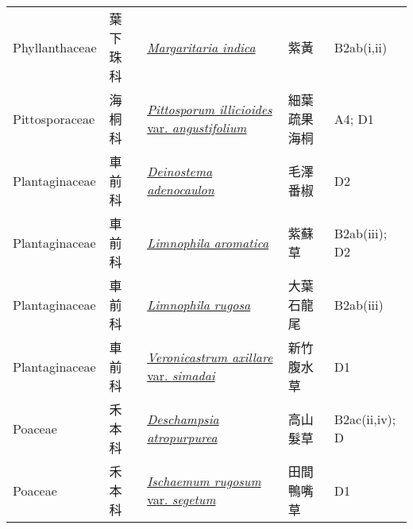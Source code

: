 {\begin{longtable}{L{2.5cm}L{2cm}L{5cm}L{2.5cm}L{3cm}}
    Phyllanthaceae & 葉下珠科 & \href{http://www.theplantlist.org/tpl1.1/search?q=Margaritaria+indica}{\textit{Margaritaria indica} } & 紫黃 & B2ab(i,ii)    \\
    Pittosporaceae & 海桐科 & \href{http://www.theplantlist.org/tpl1.1/search?q=Pittosporum+illicioides+var.+angustifolium}{\textit{Pittosporum illicioides} var. \textit{angustifolium} } & 細葉疏果海桐 & A4; D1    \\
    Plantaginaceae & 車前科 & \href{http://www.theplantlist.org/tpl1.1/search?q=Deinostema+adenocaulon}{\textit{Deinostema adenocaulon} } & 毛澤番椒 & D2    \\
    Plantaginaceae & 車前科 & \href{http://www.theplantlist.org/tpl1.1/search?q=Limnophila+aromatica}{\textit{Limnophila aromatica} } & 紫蘇草 & B2ab(iii); D2    \\
    Plantaginaceae & 車前科 & \href{http://www.theplantlist.org/tpl1.1/search?q=Limnophila+rugosa}{\textit{Limnophila rugosa} } & 大葉石龍尾 & B2ab(iii)    \\
    Plantaginaceae & 車前科 & \href{http://www.theplantlist.org/tpl1.1/search?q=Veronicastrum+axillare+var.+simadai}{\textit{Veronicastrum axillare} var. \textit{simadai} } & 新竹腹水草 & D1    \\
    Poaceae & 禾本科 & \href{http://www.theplantlist.org/tpl1.1/search?q=Deschampsia+atropurpurea}{\textit{Deschampsia atropurpurea} } & 高山髮草 & B2ac(ii,iv); D    \\
    Poaceae & 禾本科 & \href{http://www.theplantlist.org/tpl1.1/search?q=Ischaemum+rugosum+var.+segetum}{\textit{Ischaemum rugosum} var. \textit{segetum} } & 田間鴨嘴草 & D1    \\

\end{longtable}}
